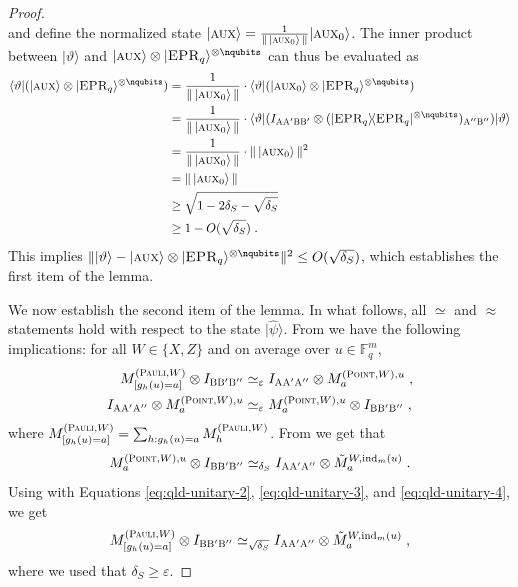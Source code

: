 \documentclass[11pt]{article}
\theoremstyle{definition}
\newcommand{\ket}[1]{|#1\rangle}
\newcommand{\bra}[1]{\langle#1|}
\newcommand{\proj}[1]{\ket{#1}\!\bra{#1}}
\newcommand{\Id}{\ensuremath{I}}
\newcommand{\F}{\ensuremath{\mathbb{F}}}
\newcommand{\ind}{\ensuremath{\mathrm{ind}}}
\newcommand{\eps}{\varepsilon}
\newcommand{\labelstyle}[1]{\ensuremath{\textsc{#1}}\xspace}
\newcommand{\EPR}{\labelstyle{EPR}}
\newcommand{\aux}{\labelstyle{aux}}
\newcommand{\alice}{\labelstyle{A}}
\newcommand{\bob}{\labelstyle{B}}
\newcommand{\typestyle}[1]{\ensuremath{\textsc{#1}}\xspace}
\newcommand{\Point}{\typestyle{Point}}
\newcommand{\Pauli}{\typestyle{Pauli}}
\begin{document}
\begin{proof}
\[\]
and define the normalized state $\ket{\aux} = \frac{1}{\| \, \ket{\aux_0} \, \|} \ket{\aux_0}$. 
The inner product between $\ket{\vartheta}$ and $\ket{\aux} \otimes \ket{\EPR_q}^{\otimes \nqubits}$ can thus be evaluated as
\begin{align*}
	\bra{\vartheta} (\ket{\aux} \otimes \ket{\EPR_q}^{\otimes \nqubits}) &= \frac{1}{\| \, \ket{\aux_0} \, \|} \cdot \bra{\vartheta} (\ket{\aux_0} \otimes \ket{\EPR_q}^{\otimes \nqubits}) \\
	&= \frac{1}{\| \, \ket{\aux_0} \, \|} \cdot \bra{\vartheta} (\Id_{\alice \alice' \bob \bob'} \otimes (\proj{\EPR_q}^{\otimes \nqubits})_{\alice'' \bob''}) \ket{\vartheta} \\
	&= \frac{1}{\| \, \ket{\aux_0} \, \|} \cdot \| \, \ket{\aux_0} \, \|^2 \\
	&= \| \, \ket{\aux_0} \, \| \\
	&\geq \sqrt{1 - 2\delta_S - \sqrt{\delta_S}} \\
	&\geq 1 - O(\sqrt{\delta_S})\;.
\end{align*}
This implies $\| \ket{\vartheta} - \ket{\aux} \otimes \ket{\EPR_q}^{\otimes \nqubits} \|^2 \leq O(\sqrt{\delta_S})$, which establishes the first item of the lemma.

We now establish the second item of the lemma. In what follows, all $\simeq$ and $\approx$ statements hold with respect to the state $\ket{\hat{\psi}}$. From  we have the following implications: for all $W \in \{X,Z\}$ and on average over $u \in \F_q^m$,
	\begin{align}
	\label{eq:qld-unitary-2}
	M^{(\Pauli,W)}_{[g_h(u)=a]} \otimes \Id_{\bob \bob' \bob''} &\simeq_\eps \Id_{\alice \alice' \alice''} \otimes M^{(\Point,W),u}_a\;, \\
	\label{eq:qld-unitary-3}
	\Id_{\alice \alice' \alice''} \otimes M^{(\Point,W),u}_a &\simeq_\eps  M^{(\Point,W),u}_a \otimes \Id_{\bob \bob' \bob''}\;,
	\end{align}
	where $M^{(\Pauli,W)}_{[g_h(u)=a]} = \sum_{h : g_h(u) = a} M^{(\Pauli,W)}_h$. 
From  we get that
	\begin{equation}
	\label{eq:qld-unitary-4}
		M^{(\Point,W),u}_a \otimes \Id_{\bob \bob' \bob''} \simeq_{\delta_S} \Id_{\alice \alice' \alice''}  \otimes \tilde{M}^{W,\ind_m(u)}_a\;.
	\end{equation}
Using  with Equations \eqref{eq:qld-unitary-2}, \eqref{eq:qld-unitary-3}, and \eqref{eq:qld-unitary-4}, we get 
	\begin{equation}
		\label{eq:qld-unitary-5}
		M^{(\Pauli,W)}_{[g_h(u)=a]} \otimes \Id_{\bob \bob' \bob''} \simeq_{\sqrt{\delta_S}} \Id_{\alice \alice' \alice''}  \otimes \tilde{M}^{W,\ind_m(u)}_a\;,
	\end{equation}
	where we used that $\delta_S \geq \eps$. 
	

\end{proof}
\end{document}
